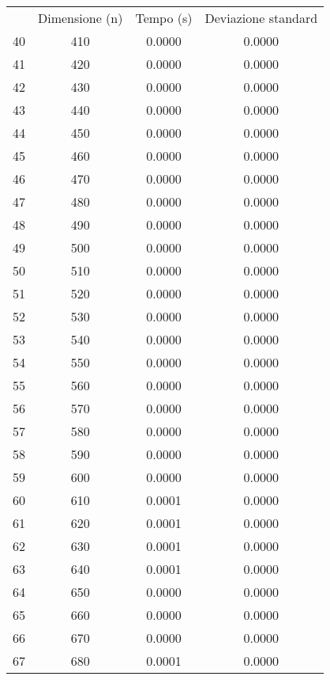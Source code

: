 \begin{table}
\centering
\begin{adjustbox}{width=1\textwidth/2}
\begin{tabular}{|c|c|c|c|}
\hline
 & Dimensione (n) & Tempo (s) & Deviazione standard \\
40 & 410 & 0.0000 & 0.0000 \\
\cline{1-4}
41 & 420 & 0.0000 & 0.0000 \\
\cline{1-4}
42 & 430 & 0.0000 & 0.0000 \\
\cline{1-4}
43 & 440 & 0.0000 & 0.0000 \\
\cline{1-4}
44 & 450 & 0.0000 & 0.0000 \\
\cline{1-4}
45 & 460 & 0.0000 & 0.0000 \\
\cline{1-4}
46 & 470 & 0.0000 & 0.0000 \\
\cline{1-4}
47 & 480 & 0.0000 & 0.0000 \\
\cline{1-4}
48 & 490 & 0.0000 & 0.0000 \\
\cline{1-4}
49 & 500 & 0.0000 & 0.0000 \\
\cline{1-4}
50 & 510 & 0.0000 & 0.0000 \\
\cline{1-4}
51 & 520 & 0.0000 & 0.0000 \\
\cline{1-4}
52 & 530 & 0.0000 & 0.0000 \\
\cline{1-4}
53 & 540 & 0.0000 & 0.0000 \\
\cline{1-4}
54 & 550 & 0.0000 & 0.0000 \\
\cline{1-4}
55 & 560 & 0.0000 & 0.0000 \\
\cline{1-4}
56 & 570 & 0.0000 & 0.0000 \\
\cline{1-4}
57 & 580 & 0.0000 & 0.0000 \\
\cline{1-4}
58 & 590 & 0.0000 & 0.0000 \\
\cline{1-4}
59 & 600 & 0.0000 & 0.0000 \\
\cline{1-4}
60 & 610 & 0.0001 & 0.0000 \\
\cline{1-4}
61 & 620 & 0.0001 & 0.0000 \\
\cline{1-4}
62 & 630 & 0.0001 & 0.0000 \\
\cline{1-4}
63 & 640 & 0.0001 & 0.0000 \\
\cline{1-4}
64 & 650 & 0.0000 & 0.0000 \\
\cline{1-4}
65 & 660 & 0.0000 & 0.0000 \\
\cline{1-4}
66 & 670 & 0.0000 & 0.0000 \\
\cline{1-4}
67 & 680 & 0.0001 & 0.0000 \\
\cline{1-4}

\end{tabular}
\end{adjustbox}
\end{table}
